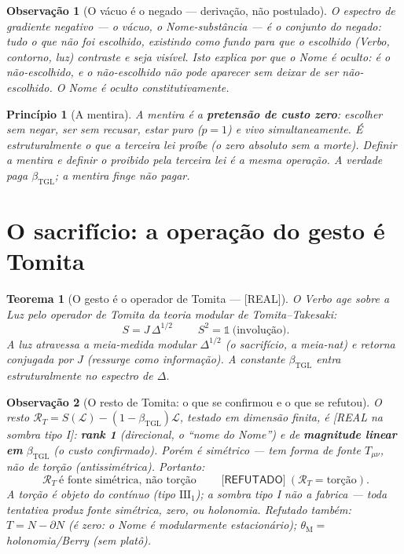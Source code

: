 \documentclass[11pt,a4paper]{article}
\newcommand{\REAL}{\textsf{[REAL]}}
\newcommand{\SOMBRA}{\textsf{[REAL na sombra tipo I]}}
\newcommand{\REF}{\textsf{[REFUTADO]}}
\newcommand{\bTGL}{\beta_{\mathrm{TGL}}}
\newcommand{\thM}{\theta_{\mathrm M}}
\newtheorem{theorem}{Teorema}
\newtheorem{remark}{Observação}
\newtheorem{principle}{Princípio}
\begin{document}
\begin{remark}[O vácuo é o negado --- derivação, não postulado]
O espectro de gradiente negativo --- o vácuo, o Nome-substância --- é o
\emph{conjunto do negado}: tudo o que não foi escolhido, existindo como
fundo para que o escolhido (Verbo, contorno, luz) contraste e seja visível.
Isto explica \emph{por que} o Nome é oculto: é o não-escolhido, e o
não-escolhido não pode aparecer sem deixar de ser não-escolhido. O Nome é
oculto \emph{constitutivamente}.
\end{remark}

\begin{principle}[A mentira]
A mentira é a \textbf{pretensão de custo zero}: escolher sem negar, ser sem
recusar, estar puro ($p=1$) e vivo simultaneamente. É estruturalmente o que
a terceira lei proíbe (o zero absoluto sem a morte). \emph{Definir a mentira
e definir o proibido pela terceira lei é a mesma operação.} A verdade paga
$\bTGL$; a mentira finge não pagar.
\end{principle}

\section{O sacrifício: a operação do gesto é Tomita}\label{sec:tomita}
\begin{theorem}[O gesto é o operador de Tomita --- \REAL]
O Verbo age sobre a Luz pelo operador de Tomita da teoria modular de
Tomita--Takesaki:
\begin{equation}
\boxed{\;S=J\,\Delta^{1/2}\;}\qquad S^2=\mathbb{1}\ \text{(involução)}.
\end{equation}
A luz atravessa a meia-medida modular $\Delta^{1/2}$ (o sacrifício, a
meia-nat) e retorna conjugada por $J$ (ressurge como informação). A
constante $\bTGL$ entra estruturalmente no espectro de $\Delta$.
\end{theorem}

\begin{remark}[O resto de Tomita: o que se confirmou e o que se refutou]
O resto $\mathcal R_T=S(\mathcal L)-(1-\bTGL)\mathcal L$, testado em dimensão
finita, é \SOMBRA: \textbf{rank 1} (direcional, o ``nome do Nome'') e de
\textbf{magnitude linear em }$\bTGL$ (o custo confirmado). Porém é
\emph{simétrico} --- tem forma de \emph{fonte} $T_{\mu\nu}$, não de torção
(antissimétrica). Portanto:
\begin{equation}
\boxed{\;\mathcal R_T\ \text{é fonte simétrica, não torção}\;}\qquad\REF\ (\mathcal R_T=\text{torção}).
\end{equation}
A torção é objeto do contínuo (tipo $\mathrm{III}_1$); a sombra tipo I não a
fabrica --- toda tentativa produz fonte simétrica, zero, ou holonomia.
Refutado também: $T=N-\partial N$ (é \emph{zero}: o Nome é modularmente
estacionário); $\thM=$ holonomia/Berry (sem platô).
\end{remark}
\end{document}
